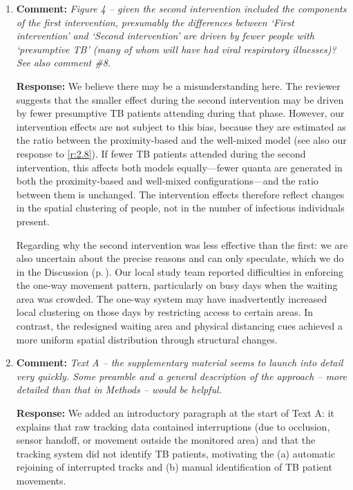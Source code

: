 \documentclass[11pt]{article}
\newcommand{\comment}[1]{\textbf{Comment:} \textit{#1}}
\newcommand{\response}[1]{\textbf{Response:} #1}
\begin{document}
\begin{enumerate}[label=\textbf{R2.\arabic*.}, leftmargin=*]
\item\label{r:2.20} \comment{Figure 4 -- given the second intervention included the components of the first intervention, presumably the differences between `First intervention' and `Second intervention' are driven by fewer people with `presumptive TB' (many of whom will have had viral respiratory illnesses)? See also comment \#8.}

\response{We believe there may be a misunderstanding here. The reviewer suggests that the smaller effect during the second intervention may be driven by fewer presumptive TB patients attending during that phase. However, our intervention effects are not subject to this bias, because they are estimated as the ratio between the proximity-based and the well-mixed model (see also our response to \ref{r:2.8}). If fewer TB patients attended during the second intervention, this affects both models equally---fewer quanta are generated in both the proximity-based and well-mixed configurations---and the ratio between them is unchanged. The intervention effects therefore reflect changes in the spatial clustering of people, not in the number of infectious individuals present.

Regarding why the second intervention was less effective than the first: we are also uncertain about the precise reasons and can only speculate, which we do in the Discussion (p.\,\pageref{disc:interventions}). Our local study team reported difficulties in enforcing the one-way movement pattern, particularly on busy days when the waiting area was crowded. The one-way system may have inadvertently increased local clustering on those days by restricting access to certain areas. In contrast, the redesigned waiting area and physical distancing cues achieved a more uniform spatial distribution through structural changes.}

\item\label{r:2.21} \comment{Text A -- the supplementary material seems to launch into detail very quickly. Some preamble and a general description of the approach -- more detailed than that in Methods -- would be helpful.}

\response{We added an introductory paragraph at the start of Text A: it explains that raw tracking data contained interruptions (due to occlusion, sensor handoff, or movement outside the monitored area) and that the tracking system did not identify TB patients, motivating the (a) automatic rejoining of interrupted tracks and (b) manual identification of TB patient movements.}


\end{enumerate}
\end{document}
